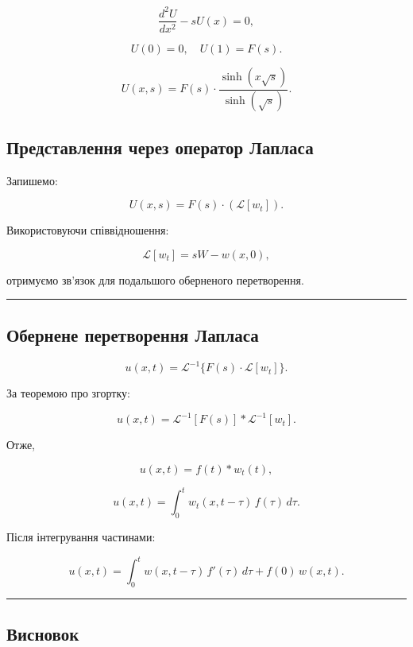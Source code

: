 \documentclass[
  ukrainian,
]{article}
\begin{document}
\[
\frac{d^2 U}{dx^2} - s U(x) = 0,
\]

\[
U(0) = 0, \quad U(1) = F(s).
\]

\[
U(x, s) = F(s)\cdot \frac{\sinh(x \sqrt{s})}{\sinh(\sqrt{s})}.
\]

\subsection{Представлення через оператор
Лапласа}\label{ux43fux440ux435ux434ux441ux442ux430ux432ux43bux435ux43dux43dux44f-ux447ux435ux440ux435ux437-ux43eux43fux435ux440ux430ux442ux43eux440-ux43bux430ux43fux43bux430ux441ux430}

Запишемо:

\[
U(x, s) = F(s) \cdot \left( \mathcal{L}[w_t] \right).
\]

Використовуючи співвідношення:

\[
\mathcal{L}[w_t] = s W - w(x, 0),
\]

отримуємо зв'язок для подальшого оберненого перетворення.

\begin{center}\rule{0.5\linewidth}{0.5pt}\end{center}

\subsection{Обернене перетворення
Лапласа}\label{ux43eux431ux435ux440ux43dux435ux43dux435-ux43fux435ux440ux435ux442ux432ux43eux440ux435ux43dux43dux44f-ux43bux430ux43fux43bux430ux441ux430}

\[
u(x, t) = \mathcal{L}^{-1}\{F(s)\cdot \mathcal{L}[w_t]\}.
\]

За теоремою про згортку:

\[
u(x, t) = \mathcal{L}^{-1}[F(s)] * \mathcal{L}^{-1}[w_t].
\]

Отже,

\[
u(x, t) = f(t) * w_t(t),
\]

\[
u(x, t) = \int_0^t w_t(x, t-\tau)\, f(\tau)\, d\tau.
\]

Після інтегрування частинами:

\[
u(x, t) = \int_{0}^{t} w(x, t-\tau)\, f'(\tau)\, d\tau + f(0)\, w(x, t).
\]

\begin{center}\rule{0.5\linewidth}{0.5pt}\end{center}

\subsection{Висновок}\label{ux432ux438ux441ux43dux43eux432ux43eux43a}
\end{document}
